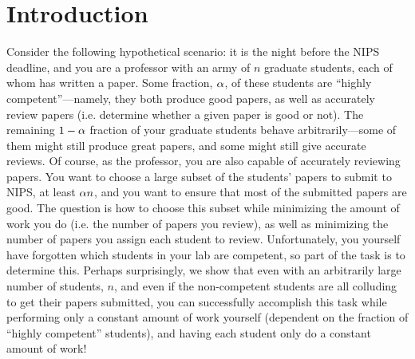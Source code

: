 \section{Introduction}

Consider the following hypothetical scenario: it is the night before the 
NIPS deadline, and you are a professor with an army of $n$ graduate students, 
each of whom has written a paper.  Some fraction, $\alpha$, of these 
students are ``highly competent''---namely, they both produce good papers, as 
well as accurately review papers (i.e. determine whether a given paper is good 
or not).  The remaining $1-\alpha$ fraction of your graduate students 
behave arbitrarily---some of them might still produce great papers, and some 
might still give accurate reviews.  Of course, as the professor, you are also 
capable of accurately reviewing papers.  You want to choose a large subset of 
the students' papers to submit to NIPS, at least $\alpha n$, and you want 
to ensure that most of the submitted papers are good.  The question is how to 
choose this subset while minimizing the amount of work you do (i.e. the number 
of papers you review), as well as minimizing the number of papers you assign 
each student to review. Unfortunately, you yourself have forgotten which students 
in your lab are competent, so part of the task is to determine this.
%
Perhaps surprisingly, we show that even with an arbitrarily large number of 
students, $n$, and even if the non-competent students are all colluding to 
get their papers submitted, you can successfully accomplish this task while 
performing only a constant amount of work yourself (dependent on the fraction 
of ``highly competent'' students), and having each student only do a constant 
amount of work!

